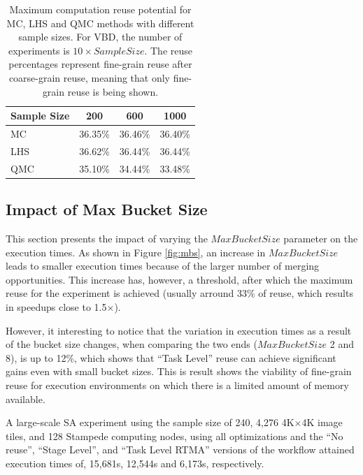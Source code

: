 \begin{center}
\begin{table}[h]%
\centering
\begin{tabular*}{250pt}{@{\extracolsep\fill}lccc@{\extracolsep\fill}}
\toprule
Sample Size	&	200	&	600	&	1000 \\
\midrule
MC	&	36.35\%	&	36.46\%	&	36.40\% \\
LHS	&	36.62\%	&	36.44\%	&	36.44\% \\
QMC	&	35.10\%	&	34.44\%	&	33.48\% \\
\bottomrule
\end{tabular*}
\caption{Maximum computation reuse potential for MC, LHS and QMC methods with different sample sizes. For VBD, the number of experiments is $10 \times SampleSize$. The reuse percentages represent fine-grain reuse after coarse-grain reuse, meaning that only fine-grain reuse is being shown.\label{tab:sa_methods}}
\end{table}
\vspace*{-3ex}
\end{center}




\subsection{Impact of Max Bucket Size}
\label{sec:bucket}

This section presents the impact of varying the $MaxBucketSize$ parameter on the execution times. As shown in Figure \ref{fig:mbs}, an increase in $MaxBucketSize$ leads to smaller execution times because of the larger number of merging opportunities. This increase has, however, a threshold, after which the maximum reuse for the experiment is achieved (usually arround 33\% of reuse, which results in speedups close to 1.5$\times$).

However, it interesting to notice that the variation in execution times as a result of the bucket size changes, when comparing the two ends ($MaxBucketSize$ 2 and 8), is up to 12\%, which shows that ``Task Level'' reuse can achieve significant gains even with small bucket sizes. This is result shows the viability of fine-grain reuse for execution environments on which there is a limited amount of memory available.

A large-scale SA experiment using the sample size of 240, 4,276 4K$\times$4K image tiles, and 128 Stampede computing nodes, using all optimizations and the ``No reuse'', ``Stage Level'', and ``Task Level RTMA'' versions of the workflow attained execution times of, 15,681s, 12,544s and 6,173s, respectively.

